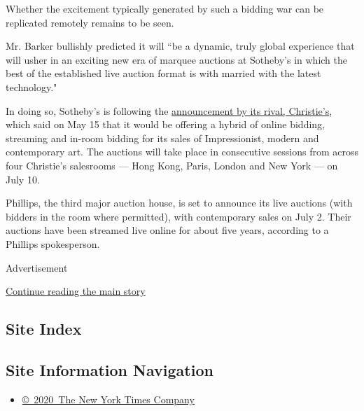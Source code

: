 Whether the excitement typically generated by such a bidding war can be
replicated remotely remains to be seen.

Mr. Barker bullishly predicted it will ``be a dynamic, truly global
experience that will usher in an exciting new era of marquee auctions at
Sotheby's in which the best of the established live auction format is
with married with the latest technology."

In doing so, Sotheby's is following the
\href{https://www.nytimes3xbfgragh.onion/2020/05/15/arts/design/christies-auction-coronavirus.html}{announcement
by its rival, Christie's}, which said on May 15 that it would be
offering a hybrid of online bidding, streaming and in-room bidding for
its sales of Impressionist, modern and contemporary art. The auctions
will take place in consecutive sessions from across four Christie's
salesrooms --- Hong Kong, Paris, London and New York --- on July 10.

Phillips, the third major auction house, is set to announce its live
auctions (with bidders in the room where permitted), with contemporary
sales on July 2. Their auctions have been streamed live online for about
five years, according to a Phillips spokesperson.

Advertisement

\protect\hyperlink{after-bottom}{Continue reading the main story}

\hypertarget{site-index}{%
\subsection{Site Index}\label{site-index}}

\hypertarget{site-information-navigation}{%
\subsection{Site Information
Navigation}\label{site-information-navigation}}

\begin{itemize}
\tightlist
\item
  \href{https://help.nytimes3xbfgragh.onion/hc/en-us/articles/115014792127-Copyright-notice}{©~2020~The
  New York Times Company}
\end{itemize}

